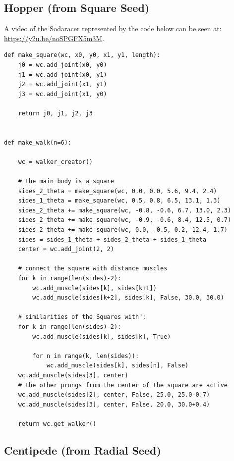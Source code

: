 \documentclass{article}
\begin{document}
\subsection{Hopper (from Square Seed)}

A video of the Sodaracer represented by the code below can be seen at: \url{https://y2u.be/noSPGFX5m3M}.



\begin{verbatim}
def make_square(wc, x0, y0, x1, y1, length):
    j0 = wc.add_joint(x0, y0)
    j1 = wc.add_joint(x0, y1)
    j2 = wc.add_joint(x1, y1)
    j3 = wc.add_joint(x1, y0)

    return j0, j1, j2, j3


def make_walk(n=6):

    wc = walker_creator()

    # the main body is a square
    sides_2_theta = make_square(wc, 0.0, 0.0, 5.6, 9.4, 2.4)
    sides_1_theta = make_square(wc, 0.5, 0.8, 6.5, 13.1, 1.3)
    sides_2_theta += make_square(wc, -0.8, -0.6, 6.7, 13.0, 2.3)
    sides_2_theta += make_square(wc, -0.9, -0.6, 8.4, 12.5, 0.7)
    sides_2_theta += make_square(wc, 0.0, -0.5, 0.2, 12.4, 1.7)
    sides = sides_1_theta + sides_2_theta + sides_1_theta
    center = wc.add_joint(2, 2)

    # connect the square with distance muscles
    for k in range(len(sides)-2):
        wc.add_muscle(sides[k], sides[k+1])
        wc.add_muscle(sides[k+2], sides[k], False, 30.0, 30.0)

    # similarities of the Squares with":
    for k in range(len(sides)-2):
        wc.add_muscle(sides[k], sides[k], True)

        for n in range(k, len(sides)):
            wc.add_muscle(sides[k], sides[n], False)
    wc.add_muscle(sides[3], center)
    # the other prongs from the center of the square are active
    wc.add_muscle(sides[2], center, False, 25.0, 25.0-0.7)
    wc.add_muscle(sides[3], center, False, 20.0, 30.0+0.4)

    return wc.get_walker()
\end{verbatim}

\subsection{Centipede (from Radial Seed)}
\end{document}
